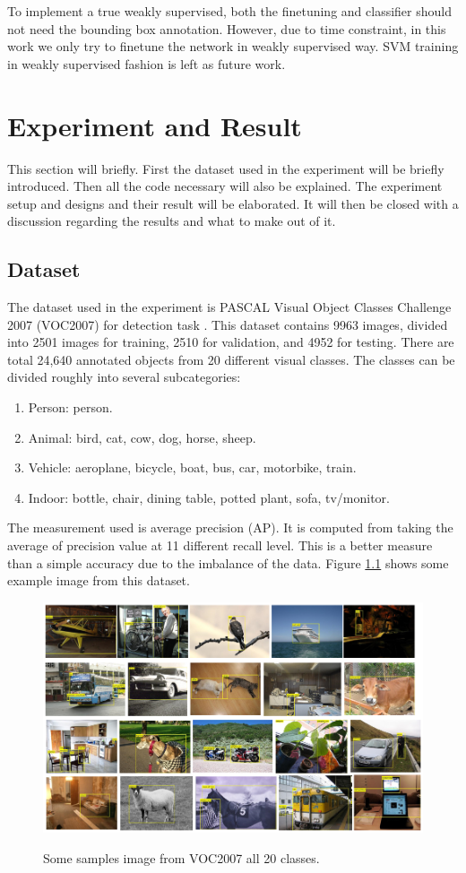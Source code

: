 \documentclass[a4paper,11pt]{kth-mag}
\begin{document}
To implement a true weakly supervised, both the finetuning and classifier should not need the bounding box annotation. However, due to time constraint, in this work we only try to finetune the network in weakly supervised way. SVM training in weakly supervised fashion is left as future work.

\chapter{Experiment and Result}
This section will briefly. First the dataset used in the experiment will be briefly introduced. Then all the code necessary will also be explained. The experiment setup and designs and their result will be elaborated. It will then be closed with a discussion regarding the results and what to make out of it.

\section{Dataset}
The dataset used in the experiment is PASCAL Visual Object Classes Challenge 2007 (VOC2007) for detection task \cite{pascal2007}. This dataset contains 9963 images, divided into 2501 images for training, 2510 for validation, and 4952 for testing. There are total 24,640 annotated objects from 20 different visual classes. The classes can be divided roughly into several subcategories:
\begin{enumerate}
\item Person: person.
\item Animal: bird, cat, cow, dog, horse, sheep.
\item Vehicle: aeroplane, bicycle, boat, bus, car, motorbike, train.
\item Indoor: bottle, chair, dining table, potted plant, sofa, tv/monitor.
\end{enumerate}

The measurement used is average precision (AP). It is computed from taking the average of precision value at 11 different recall level. This is a better measure than a simple accuracy due to the imbalance of the data. Figure \ref{fig:pascal} shows some example image from this dataset.

\begin{figure}
\centering
\includegraphics[scale=0.5]{image/pascal_samples.png}
\label{fig:pascal}
\caption{Some samples image from VOC2007 all 20 classes.}
\end{figure}
\end{document}
